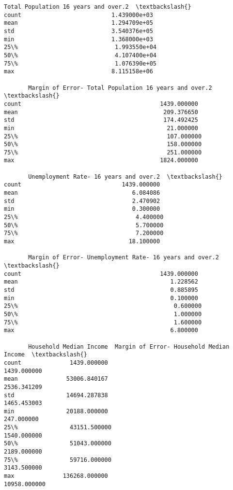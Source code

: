 \documentclass[11pt]{article}
\begin{document}
\begin{tcolorbox}[breakable, size=fbox, boxrule=.5pt, pad at break*=1mm, opacityfill=0]
\begin{Verbatim}[commandchars=\\\{\}]
       Total Population 16 years and over.2  \textbackslash{}
count                          1.439000e+03
mean                           1.294709e+05
std                            3.540376e+05
min                            1.368000e+03
25\%                            1.993550e+04
50\%                            4.107400e+04
75\%                            1.076390e+05
max                            8.115158e+06

       Margin of Error- Total Population 16 years and over.2  \textbackslash{}
count                                        1439.000000
mean                                          209.376650
std                                           174.492425
min                                            21.000000
25\%                                           107.000000
50\%                                           158.000000
75\%                                           251.000000
max                                          1824.000000

       Unemployment Rate- 16 years and over.2  \textbackslash{}
count                             1439.000000
mean                                 6.084086
std                                  2.470902
min                                  0.300000
25\%                                  4.400000
50\%                                  5.700000
75\%                                  7.200000
max                                 18.100000

       Margin of Error- Unemployment Rate- 16 years and over.2  \textbackslash{}
count                                        1439.000000
mean                                            1.228562
std                                             0.885895
min                                             0.100000
25\%                                             0.600000
50\%                                             1.000000
75\%                                             1.600000
max                                             6.800000

       Household Median Income  Margin of Error- Household Median Income  \textbackslash{}
count              1439.000000                               1439.000000
mean              53006.840167                               2536.341209
std               14694.287838                               1465.453003
min               20188.000000                                247.000000
25\%               43151.500000                               1540.000000
50\%               51043.000000                               2189.000000
75\%               59716.000000                               3143.500000
max              136268.000000                              10958.000000


\end{Verbatim}
\end{tcolorbox}
\end{document}
